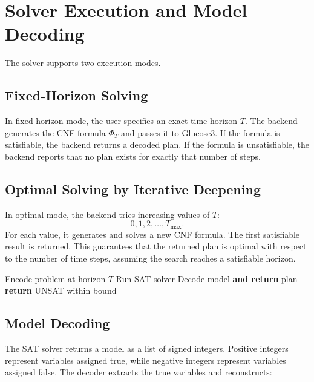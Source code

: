 \section{Solver Execution and Model Decoding} \label{sec:solver-execution-and-model-decoding}
The solver supports two execution modes.

\subsection{Fixed-Horizon Solving} \label{subsec:fixed-horizon-solving}

In fixed-horizon mode, the user specifies an exact time horizon $T$.
The backend generates the CNF formula $\Phi_T$ and passes it to Glucose3.
If the formula is satisfiable, the backend returns a decoded plan.
If the formula is unsatisfiable, the backend reports that no plan exists for exactly that number of steps.

\subsection{Optimal Solving by Iterative Deepening} \label{subsec:optimal-solving-by-iterative-deepening}

In optimal mode, the backend tries increasing values of $T$:
\[
    0, 1, 2, \ldots, T_{\max}.
\]
For each value, it generates and solves a new CNF formula.
The first satisfiable result is returned.
This guarantees that the returned plan is optimal with respect to the number of time steps, assuming the search reaches a satisfiable horizon.

\begin{algorithm}[H]
    \caption{Iterative deepening strategy for finding the shortest plan.}
    \label{alg:iterative}
    \begin{algorithmic}[1]
            \State Encode problem at horizon $T$
            \State Run SAT solver
                \State Decode model \textbf{and return} plan
            \EndIf
        \EndFor
        \State \textbf{return} UNSAT within bound
    \end{algorithmic}
\end{algorithm}

\subsection{Model Decoding} \label{subsec:model-decoding}

The SAT solver returns a model as a list of signed integers.
Positive integers represent variables assigned true, while negative integers represent variables assigned false.
The decoder extracts the true variables and reconstructs:


